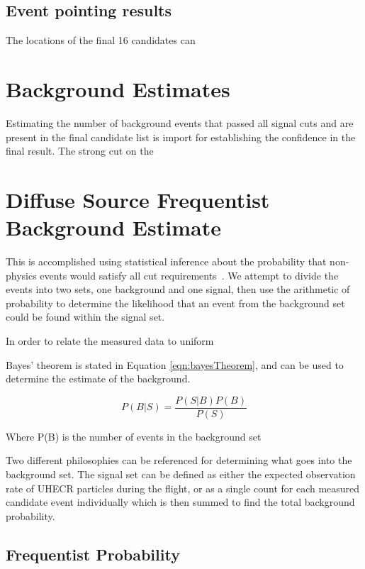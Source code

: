 	\subsection{Event pointing results}
		The locations of the final 16 candidates can 

\section{Background Estimates}
	Estimating the number of background events that passed all signal cuts and are present in the final candidate list is import for establishing the confidence in the final result.  The strong cut on the 

\section{Diffuse Source Frequentist Background Estimate}
	 This is accomplished using statistical inference about the probability that non-physics events would satisfy all cut requirements~\cite{ClassicalStatisticalEstimation}.  We attempt to divide the events into two sets, one background and one signal, then use the arithmetic of probability to determine the likelihood that an event from the background set could be found within the signal set.  

	In order to relate the measured data to uniform 
	
	Bayes' theorem is stated in Equation \ref{eqn:bayesTheorem}, and can be used to determine the estimate of the background.

	\begin{equation}
		P(B | S) = \frac{P(S | B) P(B)}{P(S)}
	\label{eqn:bayesTheorem}
	\end{equation}
	
	Where P(B) is the number of events in the background set
	
	
	Two different philosophies can be referenced for determining what goes into the background set.  The signal set can be defined as either the expected observation rate of UHECR particles during the flight, or as a single count for each measured candidate event individually which is then summed to find the total background probability.
	
	\subsection{Frequentist Probability}
		
